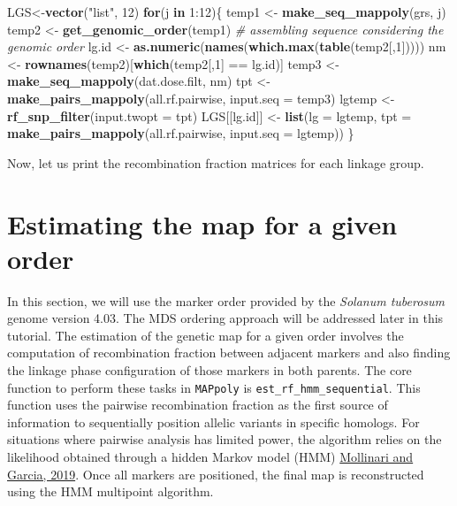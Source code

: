 \documentclass[
]{article}
\newenvironment{Shaded}{}{}
\newcommand{\CommentTok}[1]{\textcolor[rgb]{0.38,0.63,0.69}{\textit{#1}}}
\newcommand{\ControlFlowTok}[1]{\textcolor[rgb]{0.00,0.44,0.13}{\textbf{#1}}}
\newcommand{\DataTypeTok}[1]{\textcolor[rgb]{0.56,0.13,0.00}{#1}}
\newcommand{\DecValTok}[1]{\textcolor[rgb]{0.25,0.63,0.44}{#1}}
\newcommand{\KeywordTok}[1]{\textcolor[rgb]{0.00,0.44,0.13}{\textbf{#1}}}
\newcommand{\NormalTok}[1]{#1}
\newcommand{\OperatorTok}[1]{\textcolor[rgb]{0.40,0.40,0.40}{#1}}
\newcommand{\StringTok}[1]{\textcolor[rgb]{0.25,0.44,0.63}{#1}}
\begin{document}
\begin{Shaded}
\begin{Highlighting}[]
\NormalTok{LGS<-}\KeywordTok{vector}\NormalTok{(}\StringTok{"list"}\NormalTok{, }\DecValTok{12}\NormalTok{)}
\ControlFlowTok{for}\NormalTok{(j }\ControlFlowTok{in} \DecValTok{1}\OperatorTok{:}\DecValTok{12}\NormalTok{)\{}
\NormalTok{    temp1 <-}\StringTok{ }\KeywordTok{make_seq_mappoly}\NormalTok{(grs, j)}
\NormalTok{    temp2 <-}\StringTok{ }\KeywordTok{get_genomic_order}\NormalTok{(temp1) }\CommentTok{# assembling sequence considering the genomic order}
\NormalTok{    lg.id <-}\StringTok{ }\KeywordTok{as.numeric}\NormalTok{(}\KeywordTok{names}\NormalTok{(}\KeywordTok{which.max}\NormalTok{(}\KeywordTok{table}\NormalTok{(temp2[,}\DecValTok{1}\NormalTok{]))))}
\NormalTok{    nm <-}\StringTok{ }\KeywordTok{rownames}\NormalTok{(temp2)[}\KeywordTok{which}\NormalTok{(temp2[,}\DecValTok{1}\NormalTok{] }\OperatorTok{==}\StringTok{ }\NormalTok{lg.id)]}
\NormalTok{    temp3 <-}\StringTok{ }\KeywordTok{make_seq_mappoly}\NormalTok{(dat.dose.filt, nm)}
\NormalTok{    tpt <-}\StringTok{ }\KeywordTok{make_pairs_mappoly}\NormalTok{(all.rf.pairwise, }\DataTypeTok{input.seq =}\NormalTok{ temp3)}
\NormalTok{    lgtemp <-}\StringTok{ }\KeywordTok{rf_snp_filter}\NormalTok{(}\DataTypeTok{input.twopt =}\NormalTok{ tpt)}
\NormalTok{    LGS[[lg.id]] <-}\StringTok{ }\KeywordTok{list}\NormalTok{(}\DataTypeTok{lg =}\NormalTok{ lgtemp, }
        \DataTypeTok{tpt =} \KeywordTok{make_pairs_mappoly}\NormalTok{(all.rf.pairwise, }\DataTypeTok{input.seq =}\NormalTok{ lgtemp))}
\NormalTok{\}}
\end{Highlighting}
\end{Shaded}

Now, let us print the recombination fraction matrices for each linkage
group.

\hypertarget{estimating-the-map-for-a-given-order}{%
\section{Estimating the map for a given
order}\label{estimating-the-map-for-a-given-order}}

In this section, we will use the marker order provided by the
\emph{Solanum tuberosum} genome version 4.03. The MDS ordering approach
will be addressed later in this tutorial. The estimation of the genetic
map for a given order involves the computation of recombination fraction
between adjacent markers and also finding the linkage phase
configuration of those markers in both parents. The core function to
perform these tasks in \texttt{MAPpoly} is
\texttt{est\_rf\_hmm\_sequential}. This function uses the pairwise
recombination fraction as the first source of information to
sequentially position allelic variants in specific homologs. For
situations where pairwise analysis has limited power, the algorithm
relies on the likelihood obtained through a hidden Markov model (HMM)
\href{https://doi.org/10.1534/g3.119.400378}{Mollinari and Garcia,
2019}. Once all markers are positioned, the final map is reconstructed
using the HMM multipoint algorithm.
\end{document}
